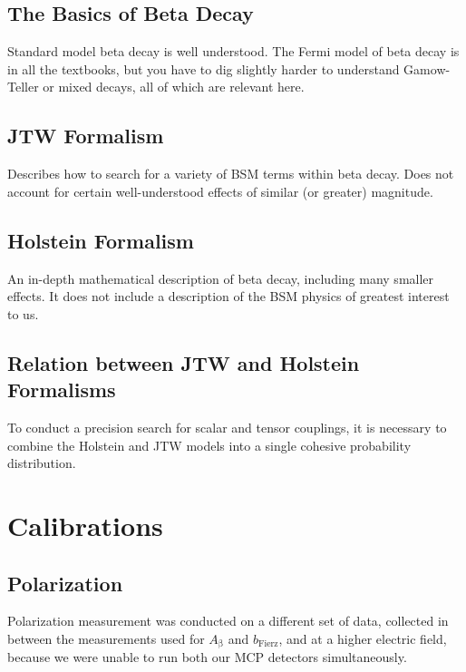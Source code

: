 \section{The Basics of Beta Decay}
	Standard model beta decay is well understood.  The Fermi model of beta decay is in all the textbooks, but you have to dig slightly harder to understand Gamow-Teller or mixed decays, all of which are relevant here.
	
\section{JTW Formalism}	
	Describes how to search for a variety of BSM terms within beta decay.  Does not account for certain well-understood effects of similar (or greater) magnitude.
	
\section{Holstein Formalism}
	An in-depth mathematical description of beta decay, including many smaller effects.  It does not include a description of the BSM physics of greatest interest to us.   
	
\section{Relation between JTW and Holstein Formalisms}
	To conduct a precision search for scalar and tensor couplings, it is necessary to combine the Holstein and JTW models into a single cohesive probability distribution.  




\clearpage	
\chapter{Calibrations}
\label{calibrations_chapter}
	
\section{Polarization}
	Polarization measurement was conducted on a different set of data, collected in between the measurements used for $A_{\mathrm{\beta}}$ and $b_{\mathrm{Fierz}}$, and at a higher electric field, because we were unable to run both our MCP detectors simultaneously.  
	
